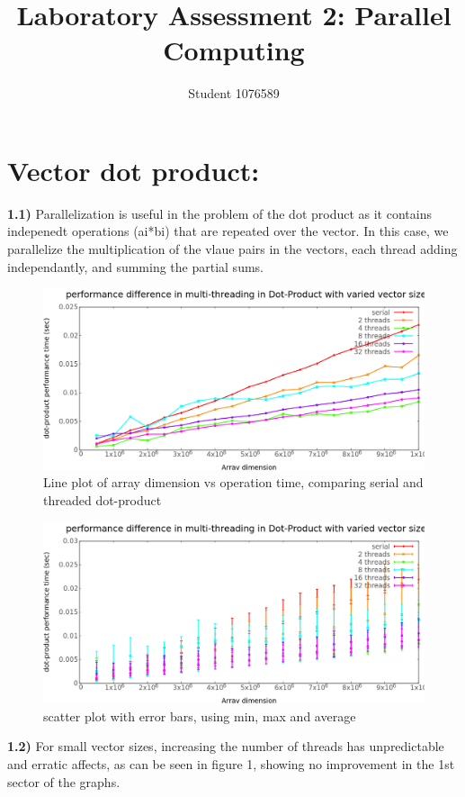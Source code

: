 \documentclass[12pt]{article}
\begin{document}
	\title{Laboratory Assessment 2: Parallel Computing}
	\author{Student 1076589}
	\maketitle
	\pagebreak
	
	\section{Vector dot product:}
	
	\textbf{1.1)} Parallelization is useful in the problem of the dot product as it contains indepenedt operations (ai*bi) that are repeated over the vector. In this case, we parallelize the multiplication of the vlaue pairs in the vectors, each thread adding independantly, and summing the partial sums. \newline
	\begin{figure}[H]
		\centering
		\begin{center}
			\includegraphics[width=1.00\textwidth]{graph1.png}
		\end{center}		
		\caption{Line plot of array dimension vs operation time, comparing serial and threaded dot-product}
	\end{figure}
	\begin{figure}[H]
		\centering
		\begin{center}
			\includegraphics[width=1.00\textwidth]{graph2.png}
		\end{center}		
		\caption{scatter plot with error bars, using min, max and average}
	\end{figure}
	\textbf{1.2)} For small vector sizes, increasing the number of threads has unpredictable and erratic affects, as can be seen in figure 1, showing no improvement in the 1st sector of the graphs. \newline
	
\end{document}
